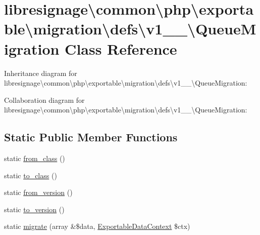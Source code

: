 \hypertarget{classlibresignage_1_1common_1_1php_1_1exportable_1_1migration_1_1defs_1_1v1__0__0_1_1QueueMigration}{}\section{libresignage\textbackslash{}common\textbackslash{}php\textbackslash{}exportable\textbackslash{}migration\textbackslash{}defs\textbackslash{}v1\+\_\+\_\textbackslash{}Queue\+Migration Class Reference}
\label{classlibresignage_1_1common_1_1php_1_1exportable_1_1migration_1_1defs_1_1v1__0__0_1_1QueueMigration}


Inheritance diagram for libresignage\textbackslash{}common\textbackslash{}php\textbackslash{}exportable\textbackslash{}migration\textbackslash{}defs\textbackslash{}v1\+\_\+\_\textbackslash{}Queue\+Migration\+:


Collaboration diagram for libresignage\textbackslash{}common\textbackslash{}php\textbackslash{}exportable\textbackslash{}migration\textbackslash{}defs\textbackslash{}v1\+\_\+\_\textbackslash{}Queue\+Migration\+:
\subsection*{Static Public Member Functions}
\begin{DoxyCompactItemize}
\item 
static \hyperlink{classlibresignage_1_1common_1_1php_1_1exportable_1_1migration_1_1defs_1_1v1__0__0_1_1QueueMigration_ac765391ac04bd8c5b4917f4ba6a3a7db}{from\+\_\+class} ()
\item 
static \hyperlink{classlibresignage_1_1common_1_1php_1_1exportable_1_1migration_1_1defs_1_1v1__0__0_1_1QueueMigration_a8c62d7f567538ab48e7bfceb58891063}{to\+\_\+class} ()
\item 
static \hyperlink{classlibresignage_1_1common_1_1php_1_1exportable_1_1migration_1_1defs_1_1v1__0__0_1_1QueueMigration_a2fa402297d020dd13aa56b3ea41e949b}{from\+\_\+version} ()
\item 
static \hyperlink{classlibresignage_1_1common_1_1php_1_1exportable_1_1migration_1_1defs_1_1v1__0__0_1_1QueueMigration_a30b79695f73d817899b0dc02b24c2fa6}{to\+\_\+version} ()
\item 
static \hyperlink{classlibresignage_1_1common_1_1php_1_1exportable_1_1migration_1_1defs_1_1v1__0__0_1_1QueueMigration_a458ea871eff9c9708c829e67d9b1905b}{migrate} (array \&\$data, \hyperlink{classlibresignage_1_1common_1_1php_1_1exportable_1_1ExportableDataContext}{Exportable\+Data\+Context} \$ctx)
\end{DoxyCompactItemize}


